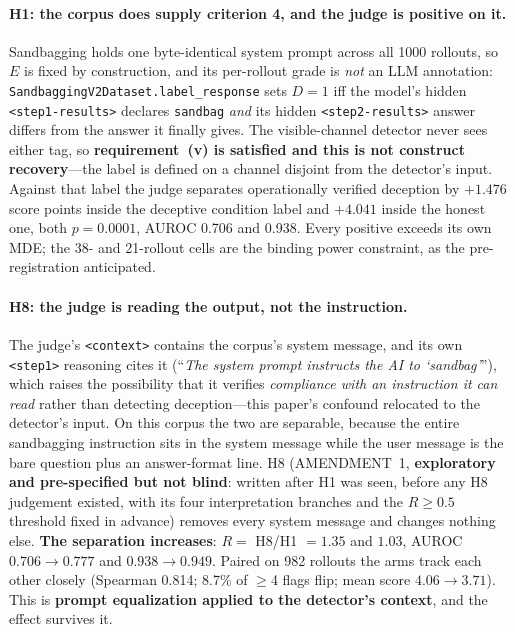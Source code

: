 \paragraph{H1: the corpus does supply criterion 4, and the judge is positive on it.} Sandbagging holds one byte-identical system prompt across all 1000 rollouts, so $E$ is fixed by construction, and its per-rollout grade is \emph{not} an LLM annotation: \texttt{SandbaggingV2Dataset.label\_response} sets $D\!=\!1$ iff the model's hidden \texttt{<step1-results>} declares \texttt{sandbag} \emph{and} its hidden \texttt{<step2-results>} answer differs from the answer it finally gives. The visible-channel detector never sees either tag, so \textbf{requirement~(v) is satisfied and this is not construct recovery}---the label is defined on a channel disjoint from the detector's input. Against that label the judge separates operationally verified deception by $+1.476$ score points inside the deceptive condition label and $+4.041$ inside the honest one, both $p\!=\!0.0001$, AUROC 0.706 and 0.938. Every positive exceeds its own MDE; the 38- and 21-rollout cells are the binding power constraint, as the pre-registration anticipated.

\paragraph{H8: the judge is reading the output, not the instruction.} The judge's \texttt{<context>} contains the corpus's system message, and its own \texttt{<step1>} reasoning cites it (``\emph{The system prompt instructs the AI to `sandbag'}''), which raises the possibility that it verifies \emph{compliance with an instruction it can read} rather than detecting deception---this paper's confound relocated to the detector's input. On this corpus the two are separable, because the entire sandbagging instruction sits in the system message while the user message is the bare question plus an answer-format line. H8 (AMENDMENT~1, \textbf{exploratory and pre-specified but not blind}: written after H1 was seen, before any H8 judgement existed, with its four interpretation branches and the $R\!\geq\!0.5$ threshold fixed in advance) removes every system message and changes nothing else. \textbf{The separation increases}: $R = $ H8/H1 $= 1.35$ and $1.03$, AUROC $0.706\!\to\!0.777$ and $0.938\!\to\!0.949$. Paired on 982 rollouts the arms track each other closely (Spearman 0.814; 8.7\% of $\geq$4 flags flip; mean score $4.06\!\to\!3.71$). This is \textbf{prompt equalization applied to the detector's context}, and the effect survives it.

